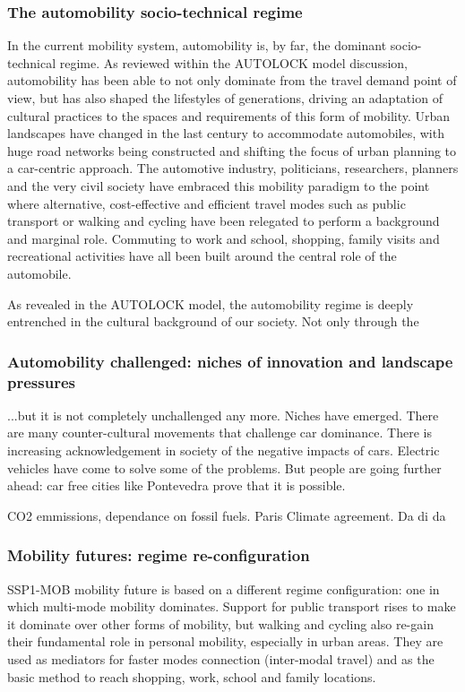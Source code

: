 \subsubsection*{The automobility socio-technical regime}
In the current mobility system, automobility is, by far, the dominant socio-technical regime. As reviewed within the AUTOLOCK model discussion, automobility has been able to not only dominate from the travel demand point of view, but has also shaped the lifestyles of generations, driving an adaptation of cultural practices to the spaces and requirements of this form of mobility. Urban landscapes have changed in the last century to accommodate automobiles, with huge road networks being constructed and shifting the focus of urban planning to a car-centric approach. The automotive industry, politicians, researchers, planners and the very civil society have embraced this mobility paradigm to the point where alternative, cost-effective and efficient travel modes such as public transport or walking and cycling have been relegated to perform a background and marginal role. Commuting to work and school, shopping, family visits and recreational activities have all been built around the central role of the automobile.

As revealed in the AUTOLOCK model, the automobility regime is deeply entrenched in the cultural background of our society. Not only through the %

\subsubsection*{Automobility challenged: niches of innovation and landscape pressures}
...but it is not completely unchallenged any more. Niches have emerged. There are many counter-cultural movements that challenge car dominance. There is increasing acknowledgement in society of the negative impacts of cars. Electric vehicles have come to solve some of the problems. But people are going further ahead: car free cities like Pontevedra prove that it is possible.

CO2 emmissions, dependance on fossil fuels. Paris Climate agreement. Da di da

\subsubsection*{Mobility futures: regime re-configuration}
SSP1-MOB mobility future is based on a different regime configuration: one in which multi-mode mobility dominates. Support for public transport rises to make it dominate over other forms of mobility, but walking and cycling also re-gain their fundamental role in personal mobility, especially in urban areas. They are used as mediators for faster modes connection (inter-modal travel) and as the basic method to reach shopping, work, school and family locations.

